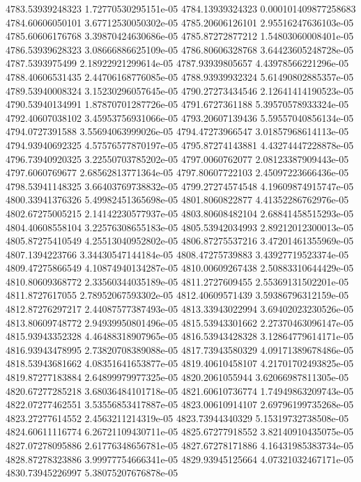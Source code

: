 {4783.53939248323 1.72770530295151e-05
4784.13939324323 0.000101409877258683
4784.60606050101 3.67712530050302e-05
4785.20606126101 2.95516247636103e-05
4785.60606176768 3.39870424630686e-05
4785.87272877212 1.54803060008401e-05
4786.53939628323 3.08666886625109e-05
4786.80606328768 3.64423605248728e-05
4787.5393975499 2.18922921299614e-05
4787.93939805657 4.43978566221296e-05
4788.40606531435 2.44706168776085e-05
4788.93939932324 5.61490802885357e-05
4789.53940008324 3.15230296057645e-05
4790.27273434546 2.12641414190523e-05
4790.53940134991 1.87870701287726e-05
4791.6727361188 5.39570578933324e-05
4792.40607038102 3.45953756931066e-05
4793.20607139436 5.59557040856134e-05
4794.0727391588 3.55694063999026e-05
4794.47273966547 3.01857968614113e-05
4794.93940692325 4.57576577870197e-05
4795.87274143881 4.43274447228878e-05
4796.73940920325 3.22550703785202e-05
4797.0060762077 2.08123387909443e-05
4797.6060769677 2.68562813771364e-05
4797.80607722103 2.45097223666436e-05
4798.53941148325 3.66403769738832e-05
4799.27274574548 4.19609874915747e-05
4800.33941376326 5.49982451365698e-05
4801.8060822877 4.41352286762976e-05
4802.67275005215 2.14142230577937e-05
4803.80608482104 2.68841458515293e-05
4804.40608558104 3.22576308655183e-05
4805.53942034993 2.89212012300013e-05
4805.87275410549 4.25513040952802e-05
4806.87275537216 3.47201461355969e-05
4807.1394223766 3.34430547144184e-05
4808.47275739883 3.43927719523374e-05
4809.47275866549 4.10874940134287e-05
4810.00609267438 2.50883310644429e-05
4810.80609368772 2.33560344035189e-05
4811.2727609455 2.55369131502201e-05
4811.8727617055 2.78952067593302e-05
4812.40609571439 3.59386796312159e-05
4812.87276297217 2.44087577387493e-05
4813.33943022994 3.69402023230526e-05
4813.80609748772 2.94939950801496e-05
4815.53943301662 2.27370463096147e-05
4815.93943352328 4.46488318907965e-05
4816.53943428328 3.12864779614171e-05
4816.93943478995 2.73820708389088e-05
4817.73943580329 4.09171389678486e-05
4818.53943681662 4.08351641653877e-05
4819.40610458107 4.21701702493825e-05
4819.87277183884 2.64899979977325e-05
4820.2061055944 3.62066987811305e-05
4820.67277285218 3.68036484101718e-05
4821.60610736774 1.74949863209743e-05
4822.07277462551 3.53556853417887e-05
4823.00610914107 2.69796199735268e-05
4823.27277614552 2.4563211214319e-05
4823.73944340329 5.15319732738508e-05
4824.60611116774 6.26721109430711e-05
4825.67277918552 3.82140910435075e-05
4827.07278095886 2.61776348656781e-05
4827.67278171886 4.16431985383734e-05
4828.87278323886 3.99977754666341e-05
4829.93945125664 4.07321032467171e-05
4830.73945226997 5.38075207676878e-05
}
